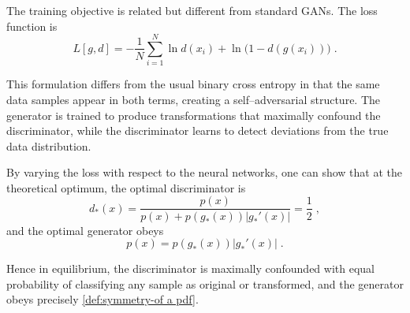     The training objective is related but different from standard GANs.
    The loss function is
    \[
        L[g,d] = -\frac{1}{N}\sum_{i=1}^{N} \ln d(x_i) + \ln\bigl(1-d(g(x_i))\bigr)\;.
    \]
    
    This formulation differs from the usual binary cross entropy in that the same data samples appear in both terms, creating a self--adversarial structure.
    The generator is trained to produce transformations that maximally confound the discriminator, while the discriminator learns to detect deviations from the true data distribution.

    By varying the loss with respect to the neural networks, one can show that at the theoretical optimum, the optimal discriminator is
    \[
        d_*(x) = \frac{p(x)}{p(x) + p(g_*(x))|g_*'(x)|} = \frac{1}{2}\;,
    \]
    and the optimal generator obeys
    \[
        p(x) = p(g_*(x))|g_*'(x)|\;.
    \]
    
    Hence in equilibrium, the discriminator is maximally confounded with equal probability of classifying any sample as original or transformed, and the generator obeys precisely \cref{def:symmetry-of a pdf}.

